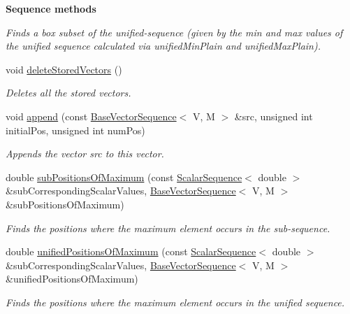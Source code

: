 \begin{Indent}{\bf Sequence methods}
\begin{DoxyCompactItemize}
\begin{DoxyCompactList}\small\item\em Finds a box subset of the unified-\/sequence (given by the min and max values of the unified sequence calculated via unified\-Min\-Plain and unified\-Max\-Plain). \end{DoxyCompactList}\item 
void \hyperlink{class_q_u_e_s_o_1_1_base_vector_sequence_a5609e02046ba555f0eebe49c6c231faf}{delete\-Stored\-Vectors} ()
\begin{DoxyCompactList}\small\item\em Deletes all the stored vectors. \end{DoxyCompactList}\item 
void \hyperlink{class_q_u_e_s_o_1_1_base_vector_sequence_a50419477cd593478815aa52af58695a8}{append} (const \hyperlink{class_q_u_e_s_o_1_1_base_vector_sequence}{Base\-Vector\-Sequence}$<$ V, M $>$ \&src, unsigned int initial\-Pos, unsigned int num\-Pos)
\begin{DoxyCompactList}\small\item\em Appends the vector {\ttfamily src} to {\ttfamily this} vector. \end{DoxyCompactList}\item 
double \hyperlink{class_q_u_e_s_o_1_1_base_vector_sequence_a971e9e1a87e4eb47b4910348a6b437d5}{sub\-Positions\-Of\-Maximum} (const \hyperlink{class_q_u_e_s_o_1_1_scalar_sequence}{Scalar\-Sequence}$<$ double $>$ \&sub\-Corresponding\-Scalar\-Values, \hyperlink{class_q_u_e_s_o_1_1_base_vector_sequence}{Base\-Vector\-Sequence}$<$ V, M $>$ \&sub\-Positions\-Of\-Maximum)
\begin{DoxyCompactList}\small\item\em Finds the positions where the maximum element occurs in the sub-\/sequence. \end{DoxyCompactList}\item 
double \hyperlink{class_q_u_e_s_o_1_1_base_vector_sequence_a4269482101b2bcdb1975543f8191ab4c}{unified\-Positions\-Of\-Maximum} (const \hyperlink{class_q_u_e_s_o_1_1_scalar_sequence}{Scalar\-Sequence}$<$ double $>$ \&sub\-Corresponding\-Scalar\-Values, \hyperlink{class_q_u_e_s_o_1_1_base_vector_sequence}{Base\-Vector\-Sequence}$<$ V, M $>$ \&unified\-Positions\-Of\-Maximum)
\begin{DoxyCompactList}\small\item\em Finds the positions where the maximum element occurs in the unified sequence. \end{DoxyCompactList}\item 

\end{DoxyCompactItemize}
\end{Indent}
